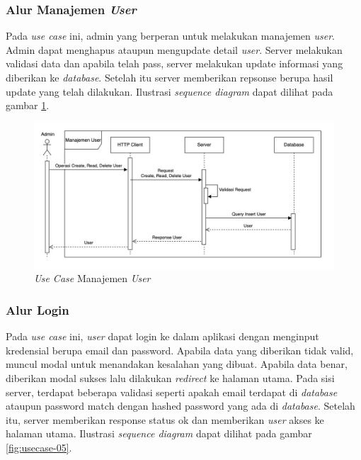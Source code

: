 \subsubsection{Alur Manajemen \textit{User}}

Pada \textit{use case} ini, admin yang berperan untuk melakukan manajemen \textit{user}. Admin dapat menghapus ataupun mengupdate detail \textit{user}. Server melakukan validasi data dan apabila telah pass, server melakukan update informasi yang diberikan ke \textit{database}. Setelah itu server memberikan repsonse berupa hasil update yang telah dilakukan. Ilustrasi \textit{sequence diagram} dapat dilihat pada gambar \ref{fig:usecase-04}.

\begin{figure}[ht]
  \centering
  \includegraphics[width=1\textwidth]{resources/chapter-3/usecase/uc-04.jpg}
  \caption{\textit{Use Case} Manajemen \textit{User}}
  \label{fig:usecase-04}
\end{figure}

\subsubsection{Alur Login}

Pada \textit{use case} ini, \textit{user} dapat login ke dalam aplikasi dengan menginput kredensial berupa email dan password. Apabila data yang diberikan tidak valid, muncul modal untuk menandakan kesalahan yang dibuat. Apabila data benar, diberikan modal sukses lalu dilakukan \textit{redirect} ke halaman utama. Pada sisi server, terdapat beberapa validasi seperti apakah email terdapat di \textit{database} ataupun password match dengan hashed password yang ada di \textit{database}. Setelah itu, server memberikan response status ok dan memberikan \textit{user} akses ke halaman utama. Ilustrasi \textit{sequence diagram} dapat dilihat pada gambar \ref{fig:usecase-05}.

